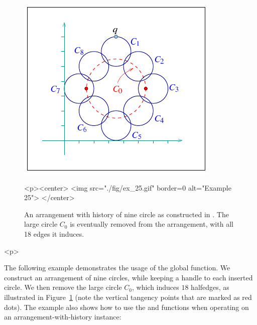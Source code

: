 
\begin{figure}[!htp]
\begin{ccTexOnly}
  \begin{center}
  \includegraphics{Arrangement_2/fig/ex_25}
  \end{center}
\end{ccTexOnly}
\begin{ccHtmlOnly}
  <p><center>
  <img src="./fig/ex_25.gif" border=0 alt="Example 25">
  </center>
\end{ccHtmlOnly}
\caption{An arrangement with history of nine circle as constructed in 
. The large circle $C_0$ is eventually removed from the
arrangement, with all 18 edges it induces.}
\label{arr_fig:ex_25}
\end{figure}

\begin{ccHtmlOnly}<p>\end{ccHtmlOnly}
The following example demonstrates the usage of the global 
function. We construct an arrangement of nine circles, while keeping a handle
to each inserted circle. We then remove the large circle $C_0$, which induces
$18$ halfedges, as illustrated in Figure~\ref{arr_fig:ex_25} (note the 
vertical tangency points that are marked as red dots). The example also shows
how to use the  and  functions when
operating on an arrangement-with-history instance:


